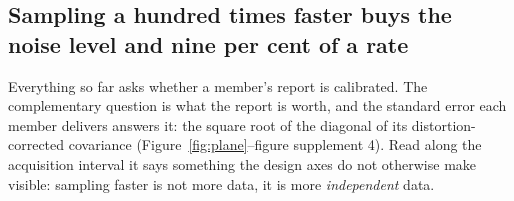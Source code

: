 \subsection*{Sampling a hundred times faster buys the noise level and nine per cent of a rate}

Everything so far asks whether a member's report is calibrated. The complementary question is what
the report is worth, and the standard error each member delivers answers it: the square root of the
diagonal of its distortion-corrected covariance (Figure~\ref{fig:plane}--figure supplement 4). Read
along the acquisition interval it says something the design axes do not otherwise make visible:
sampling faster is not more data, it is more \emph{independent} data.

